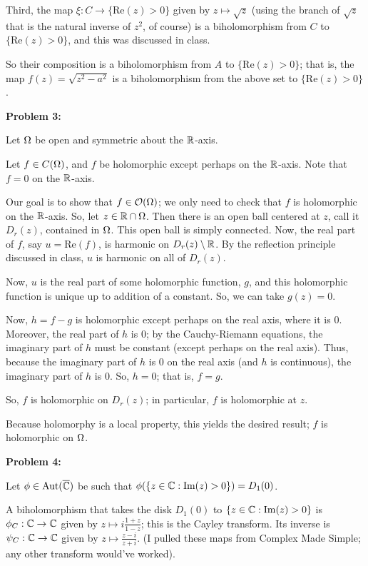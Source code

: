 \documentclass[a4paper,12pt]{article}
\begin{document}
Third, the map $\xi: C \to \{\text{Re}(z) >0\}$ given by $z \mapsto \sqrt{z}$ (using the branch of $\sqrt{z}$ that is the natural inverse of $z^2$, of course) is a biholomorphism from $C$ to $\{\text{Re}(z) >0\}$, and this was discussed in class.

So their composition is a biholomorphism from $A$ to $\{\text{Re}(z) >0\}$; that is, the map $f(z) = \sqrt{z^2-a^2}$ is a biholomorphism from the above set to $\{\text{Re}(z) >0\}$.

\shunt

{\bf Problem 3:}

Let $\Omega$ be open and symmetric about the $\mathbb{R}$-axis.

Let $f \in C(\Omega)$, and $f$ be holomorphic except perhaps on the $\mathbb{R}$-axis. Note that $f=0$ on the $\mathbb{R}$-axis.

Our goal is to show that $f \in \mathcal{O}(\Omega)$; we only need to check that $f$ is holomorphic on the $\mathbb{R}$-axis. So, let $z \in \mathbb{R} \cap \Omega$. Then there is an open ball centered at $z$, call it $D_r(z)$, contained in $\Omega$. This open ball is simply connected. Now, the real part of $f$, say $u = \text{Re}(f)$, is harmonic on $D_r(z) \setminus \mathbb{R}$. By the reflection principle discussed in class, $u$ is harmonic on all of $D_r(z)$.

Now, $u$ is the real part of some holomorphic function, $g$, and this holomorphic function is unique up to addition of a constant. So, we can take $g(z) = 0$. %

Now, $h=f-g$ is holomorphic except perhaps on the real axis, where it is $0$. Moreover, the real part of $h$ is $0$; by the Cauchy-Riemann equations, the imaginary part of $h$ must be constant (except perhaps on the real axis). Thus, because the imaginary part of $h$ is $0$ on the real axis (and $h$ is continuous), the imaginary part of $h$ is $0$. So, $h=0$; that is, $f=g$.

So, $f$ is holomorphic on $D_r(z)$; in particular, $f$ is holomorphic at $z$.

Because holomorphy is a local property, this yields the desired result; $f$ is holomorphic on $\Omega$. 

\shunt

{\bf Problem 4:}

Let $\phi \in \text{Aut}(\overline{\mathbb{C}})$ be such that $\phi(\{z\in \mathbb{C}:\text{Im}(z)>0\}) = D_1(0)$. %

A biholomorphism that takes the disk $D_1(0)$ to $\{z\in \mathbb{C}:\text{Im}(z)>0\}$ is $\phi_C: \mathbb{C} \to \mathbb{C}$ given by $z \mapsto i\frac{1+z}{1-z}$; this is the Cayley transform. Its inverse is $\psi_C: \mathbb{C} \to \mathbb{C}$ given by $z \mapsto \frac{z-i}{z+i}$. (I pulled these maps from Complex Made Simple; any other transform would've worked).
\end{document}
